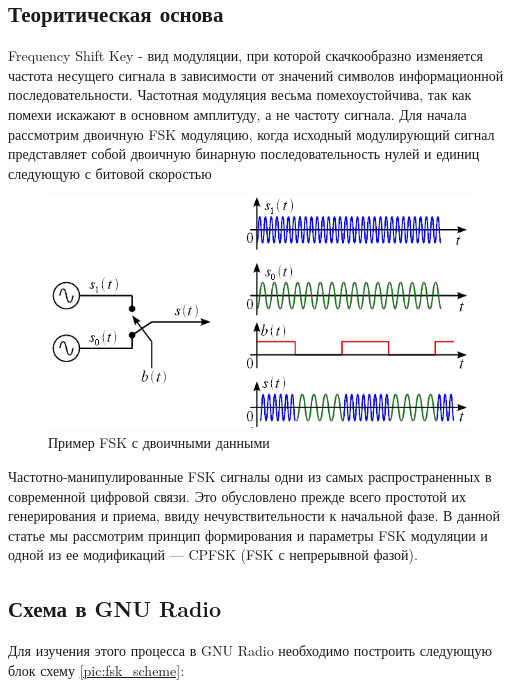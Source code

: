 \subsection{Теоритическая основа}

\qquad Frequency Shift Key - вид модуляции, при которой скачкообразно изменяется частота несущего сигнала в зависимости от значений символов информационной последовательности. Частотная модуляция весьма помехоустойчива, так как помехи искажают в основном амплитуду, а не частоту сигнала.
\quad Для начала рассмотрим двоичную FSK модуляцию, когда исходный модулирующий сигнал  представляет собой двоичную бинарную последовательность нулей и единиц следующую с битовой скоростью
    
    \begin{figure}[H]
	\begin{center}
		\includegraphics[scale=0.4]{fig/lab12/fsk.png}
		\caption{Пример FSK с двоичными данными}
		\label{pic:fsk_example} %
	\end{center}
\end{figure}

\quad Частотно-манипулированные FSK сигналы одни из самых распространенных в современной цифровой связи. Это обусловлено прежде всего простотой их генерирования и приема, ввиду нечувствительности к начальной фазе. В данной статье мы рассмотрим принцип формирования и параметры FSK модуляции и одной из ее модификаций — CPFSK (FSK с непрерывной фазой).

\subsection{Схема в GNU Radio}    
    Для изучения этого процесса в GNU Radio\cite{gnuradio} необходимо построить следующую блок схему \ref{pic:fsk_scheme}:
    
